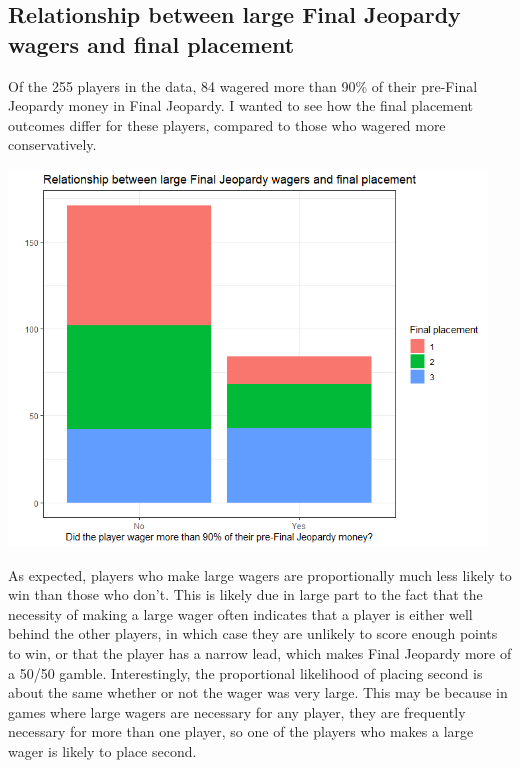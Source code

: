 \documentclass{article}
\begin{document}
\subsection{Relationship between large Final Jeopardy wagers and final placement}

Of the 255 players in the data, 84 wagered more than 90\% of their pre-Final Jeopardy money in Final Jeopardy. I wanted to see how the final placement outcomes differ for these players, compared to those who wagered more conservatively.

\smallskip

\includegraphics[width=5in]{PS6c_Mondry.png}

\smallskip

As expected, players who make large wagers are proportionally much less likely to win than those who don't. This is likely due in large part to the fact that the necessity of making a large wager often indicates that a player is either well behind the other players, in which case they are unlikely to score enough points to win, or that the player has a narrow lead, which makes Final Jeopardy more of a 50/50 gamble. Interestingly, the proportional likelihood of placing second is about the same whether or not the wager was very large. This may be because in games where large wagers are necessary for any player, they are frequently necessary for more than one player, so one of the players who makes a large wager is likely to place second.
\end{document}
